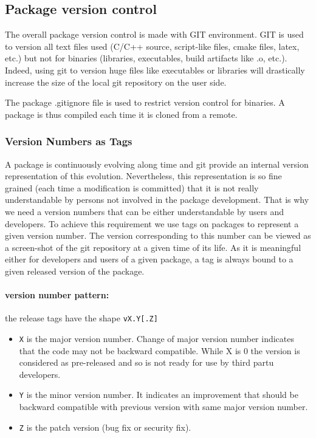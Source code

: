 \documentclass[12pt,a4paper]{article}
\begin{document}
\subsection{Package version control}

The overall package version control is made with GIT environment. GIT is used to version all text files used (C/C++ source, script-like files, cmake files, latex, etc.) but not for binaries (libraries, executables, build artifacts like .o, etc.). Indeed, using git to version huge files like executables or libraries will drastically increase the size of the local git repository on the user side.

The package .gitignore file is used to restrict version control for binaries. A package is thus compiled each time it is cloned from a remote.

\subsubsection{Version Numbers as Tags}

A package is continuously evolving along time and git provide an internal version representation of this evolution. Nevertheless, this representation is so fine grained (each time a modification is committed) that it is not really understandable by persons not involved in the package development. That is why we need a version numbers that can be either understandable by users and developers. To achieve this requirement we use tags on packages to represent a given version number. The version corresponding to this number can be viewed as a screen-shot of the git repository at a given time of its life. As it is meaningful either for developers and users of a given package, a tag is always bound to a given released version of the package.

\paragraph{version number pattern:} the release tags have the shape \texttt{vX.Y[.Z]}
\begin{itemize}
\item \texttt{X} is the major version number. Change of major version number indicates that the code may not be backward compatible. While X is 0 the version is considered as pre-released and so is not ready for use by third partu developers.
\item \texttt{Y} is the minor version number. It indicates an improvement that should be backward compatible with previous version with same major version number.
\item \texttt{Z} is the patch version (bug fix or security fix).
\end{itemize}
\end{document}
